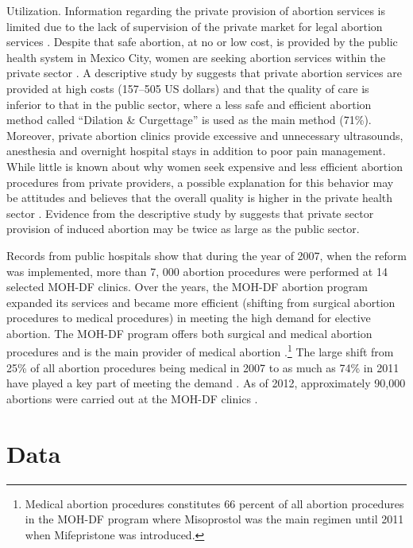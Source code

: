 \documentclass[a4paper,11pt]{article}
\begin{document}
\begin{spacing}{1.5}
Utilization.   Information regarding the private provision of abortion services is limited due to the lack of supervision of the private market for legal abortion services \citep{Becker2013}. Despite that safe abortion, at no or low cost, is provided by the public health system in Mexico City, women are seeking abortion services within the private sector \citep{schiavon2010characteristics}. A descriptive study by \cite{schiavon2010characteristics} suggests that private abortion services are provided at high costs (157–505 US dollars) and that the quality of care is inferior to that in the public sector, where a less safe and efficient abortion method called ``Dilation \& Curgettage'' is used as the main method (71\%). Moreover, private abortion clinics provide excessive and unnecessary ultrasounds, anesthesia and overnight hospital stays in addition to poor pain management.  While little is known about why women seek expensive and less efficient abortion procedures from private providers, a possible explanation for this behavior may be attitudes and believes that the overall quality is higher in the private health sector \citep{schiavon2010characteristics}. Evidence from the descriptive study by \citep{schiavon2010characteristics} suggests that private sector provision of induced abortion may be twice as large as the public sector.

Records from public hospitals show that during the year of 2007, when the reform was implemented, more than 7, 000 abortion procedures were performed at 14 selected MOH-DF clinics. Over the years, the MOH-DF abortion program expanded its services and became more efficient (shifting from surgical abortion procedures to medical procedures) in meeting the high demand for elective abortion.  The MOH-DF program offers both surgical and medical abortion procedures and is the main provider of medical abortion \citep{WinikoffSheldon2012}.\footnote{Medical abortion procedures constitutes 66 percent of all abortion procedures in the MOH-DF program where Misoprostol was the main regimen until 2011 when Mifepristone was introduced.} The large shift from 25\% of all abortion procedures being medical in 2007 to as much as 74\% in 2011 have played a key part of meeting the demand \citep{Becker2013}. As of 2012, approximately 90,000 abortions were carried out at the MOH-DF clinics \citep{Becker2013}.

\section{Data}
\label{scn:data}


\end{spacing}
\end{document}
